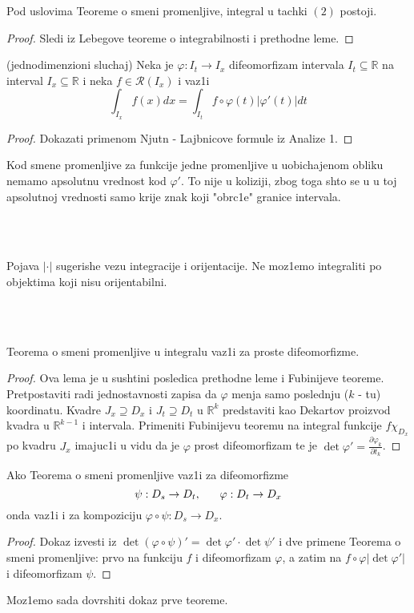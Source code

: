 \documentclass[a4paper,12pt]{article}
\newcommand{\RR}{\mathbb{R}}
\begin{document}
\begin{posl}
Pod uslovima Teoreme o smeni promenljive, integral u tachki $(2)$ postoji.
\end{posl}
\begin{proof}
Sledi iz Lebegove teoreme o integrabilnosti i prethodne leme.
\end{proof}

\begin{lema} (jednodimenzioni sluchaj) Neka je $\varphi: I_t \to I_x$ difeomorfizam intervala $I_t \subseteq \RR$ na interval $I_x \subseteq \RR$ i neka $f \in \mathcal R (I_x)$ i vaz1i 
\[\int_{I_x} f(x) dx = \int_{I_t} f \circ \varphi(t) | \varphi ' (t)| dt\]
\end{lema}

\begin{proof}
Dokazati primenom Njutn - Lajbnicove formule iz Analize 1.
\end{proof}

\begin{nap}
Kod smene promenljive za funkcije jedne promenljive u uobichajenom obliku nemamo apsolutnu vrednost kod $\varphi '$. To nije u koliziji, zbog toga shto se u u toj apsolutnoj vrednosti samo krije znak koji "obrc1e" granice intervala.
\end{nap}
\\ \\
\begin{nap}
Pojava $|\cdot|$ sugerishe vezu integracije i orijentacije. Ne moz1emo integraliti po objektima koji nisu orijentabilni.
\end{nap}
\\ \\
\begin{lema}
Teorema o smeni promenljive u integralu vaz1i za proste difeomorfizme.
\end{lema}
\begin{proof}
Ova lema je u sushtini posledica prethodne leme i Fubinijeve teoreme. Pret\-po\-sta\-vi\-ti radi jednostavnosti zapisa da $\varphi$ menja samo poslednju ($k$ - tu) koordinatu. Kvadre $J_x \supseteq D_x$ i $J_t \supseteq D_t$ u $\RR^k$ predstaviti kao Dekartov proizvod kvadra u $\RR^{k-1}$ i intervala. Primeniti Fubinijevu teoremu na integral funkcije $f \chi_{D_x}$ po kvadru $J_x$ imajuc1i u vidu da je $\varphi$ prost difeomorfizam te je $\det \varphi ' = \frac{\partial \varphi_k}{\partial t_k}$.
\end{proof}

\begin{lema}
Ako Teorema o smeni promenljive vaz1i za difeomorfizme 
\[\psi: D_s \to D_t, \hspace{0.6cm} \varphi : D_t \to D_x\]
onda vaz1i i za kompoziciju $\varphi \circ \psi : D_s \to D_x$.
\end{lema}
\begin{proof}
Dokaz izvesti iz $\det(\varphi \circ \psi)' = \det \varphi ' \cdot \det \psi '$ i dve primene Teorema o smeni promenljive: prvo na funkciju $f$ i di\-fe\-o\-mor\-fi\-zam $\varphi$, a zatim na $f \circ \varphi | \det \varphi '|$ i di\-fe\-o\-mor\-fi\-zam $\psi$.
\end{proof}
\noindent
Moz1emo sada dovrshiti dokaz prve teoreme.
\end{document}
